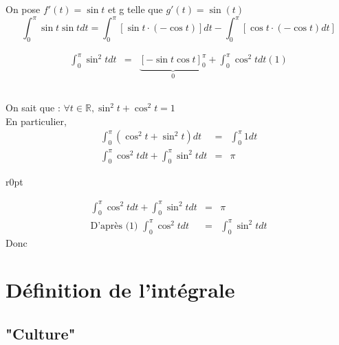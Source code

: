On pose $f'(t) = \sin t$ et g telle que $g'(t) = \sin (t)$ \[\int_0^\pi \sin t \sin t dt = \int_0^\pi[\sin t \cdot (-\cos t)] dt - \int_0^\pi[\cos t\cdot (-\cos t)dt]\] 

\[\begin{array}{rcl}
		\int_0^\pi \sin^2 t dt &=& \underbrace{[-\sin t \cos t]^\pi_0}_{0} + \int_0^\pi \cos^2 t dt (1)
\end{array}\]

\subsection{} On sait que : $\forall t \in \mathbb{R}, \sin^2 t + \cos^2 t = 1$ ~\\

En particulier, \[\begin{array}{rcl}
		\int_0^\pi(\cos^2 t + \sin^2 t)dt &=& \int_0^\pi 1 dt \\
		\int_0^\pi \cos^2 t dt + \int_0^\pi \sin^2 t dt &=& \pi
\end{array}\]

\begin{wrapfigure}[3]{r}{0pt}
\end{wrapfigure}

\[\begin{array}{rcl}
		\int_0^\pi \cos^2 t dt + \int_0^\pi \sin^2 t dt &=& \pi \\
\text{D'après (1) } \int_0^\pi \cos^2 t dt &=& \int_0^\pi \sin^2t dt \end{array}\]
Donc 

\section{Définition de l'intégrale}
\subsection{"Culture"}


